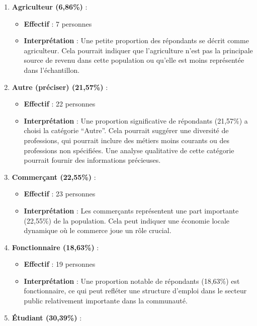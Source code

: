 \documentclass[
]{article}
\providecommand{\tightlist}{%
  \setlength{\itemsep}{0pt}\setlength{\parskip}{0pt}}
\begin{document}
\begin{enumerate}
\def\labelenumi{\arabic{enumi}.}
\tightlist
\item
  \textbf{Agriculteur (6,86\%)} :

  \begin{itemize}
  \tightlist
  \item
    \textbf{Effectif} : 7 personnes
  \item
    \textbf{Interprétation} : Une petite proportion des répondants se
    décrit comme agriculteur. Cela pourrait indiquer que l'agriculture
    n'est pas la principale source de revenu dans cette population ou
    qu'elle est moins représentée dans l'échantillon.
  \end{itemize}
\item
  \textbf{Autre (préciser) (21,57\%)} :

  \begin{itemize}
  \tightlist
  \item
    \textbf{Effectif} : 22 personnes
  \item
    \textbf{Interprétation} : Une proportion significative de répondants
    (21,57\%) a choisi la catégorie ``Autre''. Cela pourrait suggérer
    une diversité de professions, qui pourrait inclure des métiers moins
    courants ou des professions non spécifiées. Une analyse qualitative
    de cette catégorie pourrait fournir des informations précieuses.
  \end{itemize}
\item
  \textbf{Commerçant (22,55\%)} :

  \begin{itemize}
  \tightlist
  \item
    \textbf{Effectif} : 23 personnes
  \item
    \textbf{Interprétation} : Les commerçants représentent une part
    importante (22,55\%) de la population. Cela peut indiquer une
    économie locale dynamique où le commerce joue un rôle crucial.
  \end{itemize}
\item
  \textbf{Fonctionnaire (18,63\%)} :

  \begin{itemize}
  \tightlist
  \item
    \textbf{Effectif} : 19 personnes
  \item
    \textbf{Interprétation} : Une proportion notable de répondants
    (18,63\%) est fonctionnaire, ce qui peut refléter une structure
    d'emploi dans le secteur public relativement importante dans la
    communauté.
  \end{itemize}
\item
  \textbf{Étudiant (30,39\%)} :


\end{enumerate}
\end{document}

